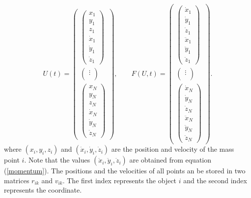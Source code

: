 \begin{equation} 
U(t) =
\begin{pmatrix}
\begin{pmatrix}
  x_1 \\ y_1 \\ z_1 \\ \dot x_1 \\ \dot y_1 \\ \dot z_1 
\end{pmatrix}
\\
\begin{pmatrix}
  \vdots \\
\end{pmatrix}
\\
\begin{pmatrix}
  x_N \\ y_N \\ z_N \\ \dot x_N \\ \dot y_N \\ \dot z_N 
\end{pmatrix}
\end{pmatrix}, \qquad
F(U,t) =
\begin{pmatrix}
\begin{pmatrix}
  \dot x_1 \\ \dot y_1 \\ \dot z_1 \\ \ddot x_1 \\ \ddot y_1 \\ \ddot z_1 
\end{pmatrix}
\\
\begin{pmatrix}
  \vdots \\
\end{pmatrix}
\\
\begin{pmatrix}
  \dot x_N \\ \dot y_N \\ \dot z_N \\ \ddot x_N \\ \ddot y_N \\ \ddot z_N 
\end{pmatrix}
\end{pmatrix}.
\end{equation} 
where $ (x_i, y_i, z_i )$ and $ (\dot x_i, \dot y_i, \dot z_i )$ are the position and velocity 
of the  mass point $ i $. Note that the values $ (\ddot x_i, \ddot y_i, \ddot z_i )$
are obtained from equation (\ref{momentum}). The positions and the velocities of all points 
an be stored in two matrices ${r}_{ik} $ and  ${v}_{ik} $.
The first index represents the object $i$ and the second index represents the coordinate. 

